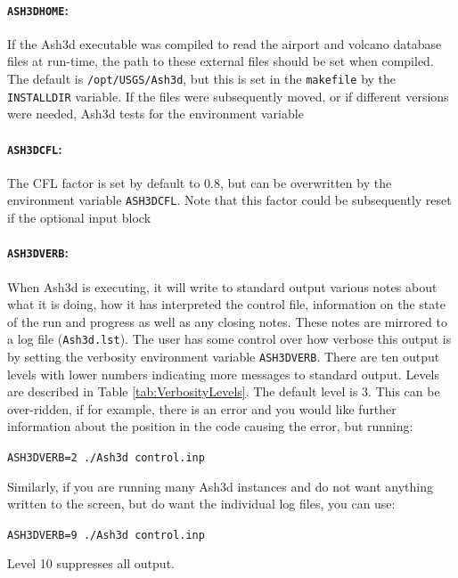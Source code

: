 \paragraph{\texttt{ASH3DHOME}:}
If the Ash3d executable was compiled to read the
airport and volcano database files at
run-time, the path to these external files should be set when compiled.  The default is
\texttt{/opt/USGS/Ash3d}, but this is set in the \texttt{makefile} by the \texttt{INSTALLDIR}
variable.  If the files were subsequently moved, or if different versions were needed,
Ash3d tests for the environment variable 

\paragraph{\texttt{ASH3DCFL}:} The CFL factor
is set by default to 0.8, but can be overwritten by the environment variable \texttt{ASH3DCFL}.
Note that this factor could be subsequently reset if the optional input block

\paragraph{\texttt{ASH3DVERB}:} When Ash3d is executing, it will write to standard output
various notes about what it is doing, how it has interpreted the control file, information
on the state of the run and progress as well as any closing notes.  These notes are mirrored
to a log file (\texttt{Ash3d.lst}).  The user has some control over how verbose this output
is by setting the verbosity environment variable \texttt{ASH3DVERB}.  There are ten output
levels with lower numbers indicating more messages to standard output. Levels are described
in Table \ref{tab:VerbosityLevels}. The default level is 3. This can be over-ridden, if
for example, there is an error and you would like further information about the position in
the code causing the error, but running:

\texttt{ASH3DVERB=2 ./Ash3d control.inp}

Similarly, if you are running many Ash3d instances and do not want anything written to the
screen, but do want the individual log files, you can use:

\texttt{ASH3DVERB=9 ./Ash3d control.inp}

Level 10 suppresses all output.

